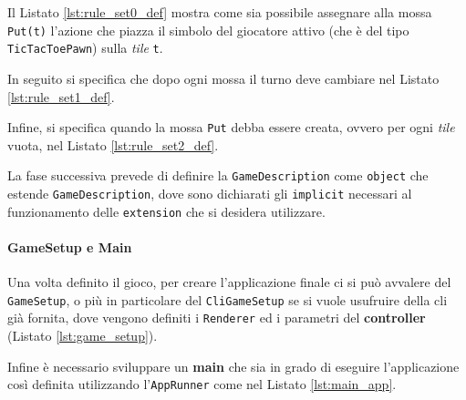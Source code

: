 Il Listato \ref{lst:rule_set0_def} mostra come sia possibile assegnare alla mossa \texttt{Put(t)} l'azione che piazza il simbolo del giocatore attivo (che è del tipo \texttt{TicTacToePawn}) sulla \textit{tile} \texttt{t}.
%

%
In seguito si specifica che dopo ogni mossa il turno deve cambiare nel Listato \ref{lst:rule_set1_def}.

%
Infine, si specifica quando la mossa \texttt{Put} debba essere creata, ovvero per ogni \textit{tile} vuota, nel Listato \ref{lst:rule_set2_def}.
%


La fase successiva prevede di definire la \texttt{GameDescription} come \texttt{object} che estende \texttt{GameDescription}, dove sono dichiarati gli \texttt{implicit} necessari al funzionamento delle \texttt{extension} che si desidera utilizzare.

\paragraph{GameSetup e Main}
Una volta definito il gioco, per creare l'applicazione finale ci si può avvalere del \texttt{GameSetup}, o più in particolare del \texttt{CliGameSetup} se si vuole usufruire della cli già fornita, dove vengono definiti i \texttt{Renderer} ed i parametri del \textbf{controller} (Listato \ref{lst:game_setup}).
%

%
Infine è necessario sviluppare un \textbf{main} che sia in grado di eseguire l'applicazione così definita utilizzando l'\texttt{AppRunner} come nel Listato \ref{lst:main_app}.
%
